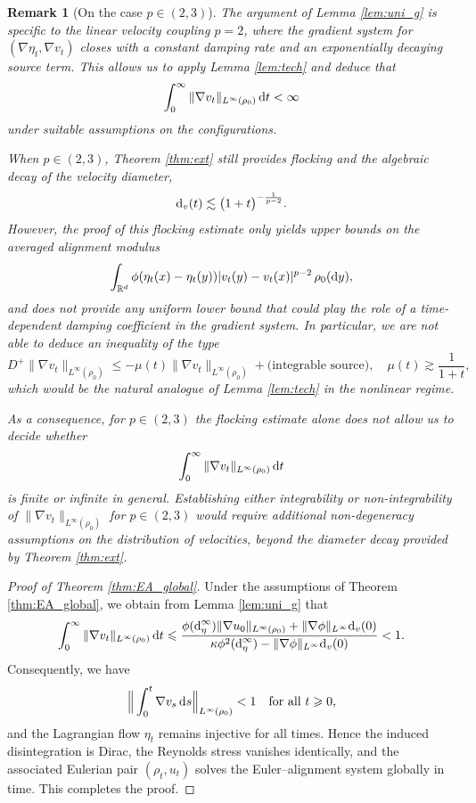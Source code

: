 \documentclass[10pt,reqno]{amsart}
\renewcommand{\ge}{\geqslant}
\renewcommand{\leq}{\leqslant}
\renewcommand{\le}{\leqslant}
\numberwithin{equation}{section}
\newtheorem{remark}{Remark}[section]
\newcommand{\R}{\mathbb R}
\newcommand{\intr}{\int_{\R^d}}
\newcommand{\rd}{\textnormal{d}}
\newcommand{\dt}{\textnormal{d}t}
\newcommand{\dy}{\textnormal{d}y}
\newcommand{\ds}{\textnormal{d}s}
\begin{document}
  
 \begin{remark}[On the case $p\in(2,3)$]\label{rem:p23}
The argument of Lemma \ref{lem:uni_g} is specific to the linear velocity coupling $p=2$,  where the gradient system for $(\nabla\eta_t,\nabla v_t)$ closes with a constant damping rate and an exponentially decaying source term.  This allows us to apply Lemma \ref{lem:tech} and deduce that
\[
\int_0^\infty \|\nabla v_t\|_{L^\infty(\rho_0)}\,\dt < \infty
\]
under suitable assumptions on the configurations.

When $p\in(2,3)$, Theorem \ref{thm:ext} still provides flocking and the algebraic decay of the velocity diameter,
\[
\rd_v(t) \lesssim \big(1+t\big)^{-\frac{1}{p-2}}.
\]
However, the proof of this flocking estimate only yields \emph{upper} bounds on the averaged alignment modulus
\[
\intr\phi(\eta_t(x)-\eta_t(y)) |v_t(y)-v_t(x)|^{p-2}\,\rho_0(\dy),
\]
and does not provide any uniform \emph{lower} bound that could play the role of a time-dependent damping coefficient in the gradient system. In particular, we are not able to deduce an inequality of the type
\[
D^+\|\nabla v_t\|_{L^\infty(\rho_0)} \le -\mu(t) \|\nabla v_t\|_{L^\infty(\rho_0)} + \text{(integrable source)}, \quad  \mu(t)\gtrsim \frac{1}{1+t},
\]
which would be the natural analogue of Lemma \ref{lem:tech} in the nonlinear regime.

As a consequence, for $p\in(2,3)$ the flocking estimate alone does not allow us to decide whether
\[
\int_0^\infty \|\nabla v_t\|_{L^\infty(\rho_0)}\,\dt
\]
is finite or infinite in general. Establishing either integrability or non-integrability of $\|\nabla v_t\|_{L^\infty(\rho_0)}$ for $p\in(2,3)$ would require additional non-degeneracy assumptions on the distribution of velocities, beyond the diameter decay provided by Theorem \ref{thm:ext}.
\end{remark}
 
 \begin{proof}[Proof of Theorem \ref{thm:EA_global}]Under the assumptions of Theorem \ref{thm:EA_global}, we obtain from Lemma \ref{lem:uni_g} that 
  \[
 \int_0^\infty \|\nabla v_t\|_{L^\infty(\rho_0)}\,\dt \leq \frac{\phi(\rd_\eta^\infty)\|\nabla u_0\|_{L^\infty(\rho_0)}+ \|\nabla\phi\|_{L^\infty} \rd_v(0)}{\kappa \phi^2(\rd_\eta^\infty) - \|\nabla\phi\|_{L^\infty} \rd_v(0)} < 1.
 \]
Consequently, we have
\[
\Big\|\int_0^t \nabla v_s\,\ds\Big\|_{L^\infty(\rho_0)} < 1
\quad \text{for all } t \ge 0,
\]
and the Lagrangian flow $\eta_t$ remains injective for all times. Hence the induced disintegration is Dirac, the Reynolds stress vanishes identically, and the associated Eulerian pair $(\rho_t,u_t)$ solves the Euler--alignment system globally in time. This completes the proof.
 \end{proof}
 
\end{document}
